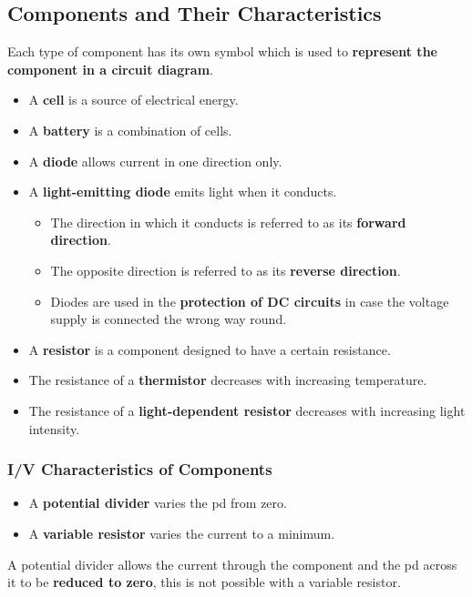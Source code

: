 \subsection{Components and Their Characteristics}

Each type of component has its own symbol which is used to \textbf{represent the component in a circuit diagram}.

\begin{itemize}
    \item A \textbf{cell} is a source of electrical energy.
    \item A \textbf{battery} is a combination of cells.
    \item A \textbf{diode} allows current in one direction only.
    \item A \textbf{light-emitting diode} emits light when it conducts.
        \begin{itemize}
            \item The direction in which it conducts is referred to as its \textbf{forward direction}.
            \item The opposite direction is referred to as its \textbf{reverse direction}.
            \item Diodes are used in the \textbf{protection of DC circuits} in case the voltage supply is connected the wrong way round.
        \end{itemize}
    \item A \textbf{resistor} is a component designed to have a certain resistance.
    \item The resistance of a \textbf{thermistor} decreases with increasing temperature.
    \item The resistance of a \textbf{light-dependent resistor} decreases with increasing light intensity.
\end{itemize}

\subsubsection*{I/V Characteristics of Components}

\begin{itemize}
    \item A \textbf{potential divider} varies the pd from zero.
    \item A \textbf{variable resistor} varies the current to a minimum.
\end{itemize}

A potential divider allows the current through the component and the pd across it to be \textbf{reduced to zero}, this is not possible with a variable resistor.


